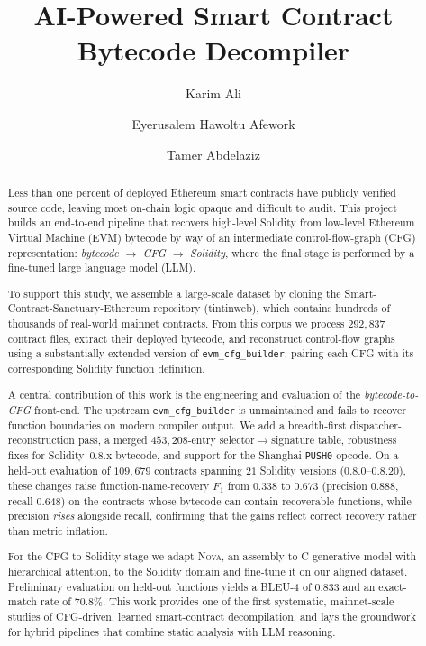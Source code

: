 \documentclass{stylefiles/capstone}
\begin{document}
\title{AI-Powered Smart Contract Bytecode Decompiler}


\author{Karim Ali}

\author{Eyerusalem Hawoltu Afework}

\author{Tamer Abdelaziz}

\renewcommand{\shortauthors}{Ali, Afework, Abdelaziz}

\begin{abstract}
Less than one percent of deployed Ethereum smart contracts have publicly verified
source code, leaving most on-chain logic opaque and difficult to audit. This
project builds an end-to-end pipeline that recovers high-level Solidity from
low-level Ethereum Virtual Machine (EVM) bytecode by way of an intermediate
control-flow-graph (CFG) representation: \emph{bytecode $\rightarrow$ CFG
$\rightarrow$ Solidity}, where the final stage is performed by a fine-tuned large
language model (LLM).

To support this study, we assemble a large-scale dataset by cloning the
Smart-Contract-Sanctuary-Ethereum repository (tintinweb), which contains hundreds
of thousands of real-world mainnet contracts. From this corpus we process
$292{,}837$ contract files, extract their deployed bytecode, and reconstruct
control-flow graphs using a substantially extended version of
\texttt{evm\_cfg\_builder}, pairing each CFG with its corresponding Solidity
function definition.

A central contribution of this work is the engineering and evaluation of the
\emph{bytecode-to-CFG} front-end. The upstream \texttt{evm\_cfg\_builder} is
unmaintained and fails to recover function boundaries on modern compiler output.
We add a breadth-first dispatcher-reconstruction pass, a merged
$453{,}208$-entry selector$\rightarrow$signature table, robustness fixes for
Solidity~0.8.x bytecode, and support for the Shanghai \texttt{PUSH0} opcode. On a
held-out evaluation of $109{,}679$ contracts spanning $21$ Solidity versions
(0.8.0--0.8.20), these changes raise function-name-recovery $F_1$ from $0.338$ to
$0.673$ (precision $0.888$, recall $0.648$) on the contracts whose bytecode can
contain recoverable functions, while precision \emph{rises} alongside recall,
confirming that the gains reflect correct recovery rather than metric inflation.

For the CFG-to-Solidity stage we adapt \textsc{Nova}, an assembly-to-C
generative model with hierarchical attention, to the Solidity domain and
fine-tune it on our aligned dataset. Preliminary evaluation on held-out functions
yields a BLEU-4 of $0.833$ and an exact-match rate of $70.8\%$. This work
provides one of the first systematic, mainnet-scale studies of CFG-driven,
learned smart-contract decompilation, and lays the groundwork for hybrid pipelines
that combine static analysis with LLM reasoning.
\end{abstract}
\end{document}

